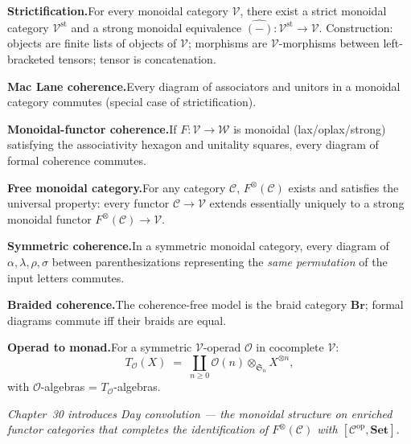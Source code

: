 \begin{formalrestatement}
\textbf{Strictification.}\quad For every monoidal category $\mathcal{V}$,
there exist a strict monoidal category $\mathcal{V}^{\mathrm{st}}$ and a
strong monoidal equivalence $\widehat{(-)} : \mathcal{V}^{\mathrm{st}} \to
\mathcal{V}$. Construction: objects are finite lists of objects of
$\mathcal{V}$; morphisms are $\mathcal{V}$-morphisms between left-bracketed
tensors; tensor is concatenation.

\medskip
\textbf{Mac Lane coherence.}\quad Every diagram of associators and unitors
in a monoidal category commutes (special case of strictification).

\medskip
\textbf{Monoidal-functor coherence.}\quad If $F : \mathcal{V} \to \mathcal{W}$
is monoidal (lax/oplax/strong) satisfying the associativity hexagon and
unitality squares, every diagram of formal coherence commutes.

\medskip
\textbf{Free monoidal category.}\quad For any category $\mathcal{C}$,
$F^\otimes(\mathcal{C})$ exists and satisfies the universal property: every
functor $\mathcal{C} \to \mathcal{V}$ extends essentially uniquely to a
strong monoidal functor $F^\otimes(\mathcal{C}) \to \mathcal{V}$.

\medskip
\textbf{Symmetric coherence.}\quad In a symmetric monoidal category, every
diagram of $\alpha, \lambda, \rho, \sigma$ between parenthesizations
representing the \emph{same permutation} of the input letters commutes.

\medskip
\textbf{Braided coherence.}\quad The coherence-free model is the braid
category $\mathbf{Br}$; formal diagrams commute iff their braids are equal.

\medskip
\textbf{Operad to monad.}\quad For a symmetric $\mathcal{V}$-operad
$\mathcal{O}$ in cocomplete $\mathcal{V}$:
\begin{equation*}
  T_\mathcal{O}(X) \;=\; \coprod_{n \geq 0} \mathcal{O}(n) \otimes_{\mathfrak{S}_n}
  X^{\otimes n},
\end{equation*}
with $\mathcal{O}$-algebras = $T_\mathcal{O}$-algebras.

\medskip
\noindent\textit{Chapter~30 introduces \emph{Day convolution} — the
monoidal structure on enriched functor categories that completes the
identification of $F^\otimes(\mathcal{C})$ with $[\mathcal{C}^{\mathrm{op}},
\mathbf{Set}]$.}
\end{formalrestatement}
